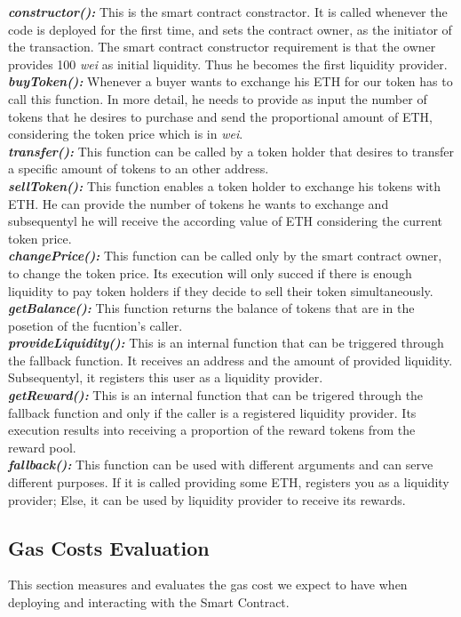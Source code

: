 \documentclass[12pt,a4paper]{article}
\begin{document}
\textbf{\emph{constructor():}} This is the smart contract constractor. It is called
whenever the code is deployed for the first time, and sets the contract owner,
as the initiator of the transaction. The smart contract constructor requirement
is that the owner provides 100 \emph{wei} as initial liquidity. Thus he becomes
the first liquidity provider.\\
\textbf{\emph{buyToken():}} Whenever a buyer wants to exchange his ETH for our token has
to call this function. In more detail, he needs to provide as input the number
of tokens that he desires to purchase and send the proportional amount of ETH,
considering the token price which is in \emph{wei}.\\
\textbf{\emph{transfer():}} This function can be called by a token holder that desires to
transfer a specific amount of tokens to an other address.\\
\textbf{\emph{sellToken():}} This function enables a token holder to exchange his tokens
with ETH. He can provide the number of tokens he wants to exchange and
subsequentyl he will receive the according value of ETH considering the current
token price.\\
\textbf{\emph{changePrice():}} This function can be called only by the smart contract
owner, to change the token price. Its execution will only succed if there is
enough liquidity to pay token holders if they decide to sell their token
simultaneously.\\
\textbf{\emph{getBalance():}} This function returns the balance of tokens that are in the
posetion of the fucntion's caller.\\
\textbf{\emph{provideLiquidity():}} This is an internal function that can be triggered
through the fallback function. It receives an address and the amount of provided
liquidity. Subsequentyl, it registers this user as a liquidity provider. \\
\textbf{\emph{getReward():}} This is an internal function that can be trigered through
the fallback function and only if the caller is a registered liquidity provider.
Its execution results into receiving a proportion of the reward tokens from the
reward pool.\\
\textbf{\emph{fallback():}} This function can be used with different arguments and can
serve different purposes. If it is called providing some ETH, registers you as a
liquidity provider; Else, it can be used by liquidity provider to receive its
rewards.

\subsection*{Gas Costs Evaluation}
This section measures and evaluates the gas cost we expect to have when deploying and
interacting with the Smart Contract. \\
\end{document}
